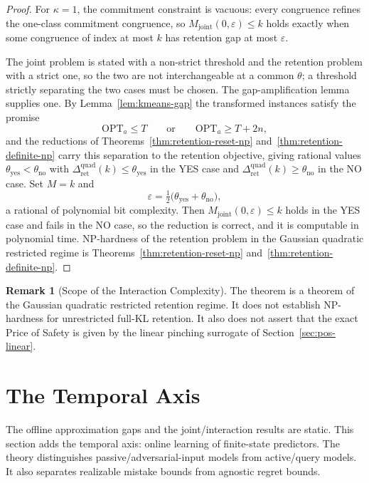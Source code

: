 \documentclass[12pt]{article}
\theoremstyle{definition}
\newtheorem{remark}[theorem]{Remark}
\newcommand{\RetQuad}{\Delta_{\mathrm{ret}}^{\mathrm{quad}}}
\begin{document}
\begin{proof}
For $\kappa=1$, the commitment constraint is vacuous: every congruence refines
the one-class commitment congruence, so $M_{\mathrm{joint}}(0,\varepsilon)\le k$
holds exactly when some congruence of index at most $k$ has retention gap at
most $\varepsilon$.

The joint problem is stated with a non-strict threshold and the retention
problem with a strict one, so the two are not interchangeable at a common
$\theta$; a threshold strictly separating the two cases must be chosen.  The
gap-amplification lemma supplies one.  By Lemma~\ref{lem:kmeans-gap} the
transformed instances satisfy the promise
\[
\mathrm{OPT}_a\le T
\qquad\text{or}\qquad
\mathrm{OPT}_a\ge T+2n ,
\]
and the reductions of Theorems~\ref{thm:retention-reset-np}
and~\ref{thm:retention-definite-np} carry this separation to the retention
objective, giving rational values $\theta_{\mathrm{yes}}<\theta_{\mathrm{no}}$
with $\RetQuad(k)\le\theta_{\mathrm{yes}}$ in the YES case and
$\RetQuad(k)\ge\theta_{\mathrm{no}}$ in the NO case.  Set $M=k$ and
\[
\varepsilon=\tfrac12\bigl(\theta_{\mathrm{yes}}+\theta_{\mathrm{no}}\bigr),
\]
a rational of polynomial bit complexity.  Then
$M_{\mathrm{joint}}(0,\varepsilon)\le k$ holds in the YES case and fails in the
NO case, so the reduction is correct, and it is computable in polynomial time.
NP-hardness of the retention problem in the Gaussian quadratic restricted
regime is Theorems~\ref{thm:retention-reset-np}
and~\ref{thm:retention-definite-np}.
\end{proof}

\begin{remark}[Scope of the Interaction Complexity]
\label{rem:interaction-complexity-scope}
The theorem is a theorem of the Gaussian quadratic restricted retention regime.
It does not establish NP-hardness for unrestricted full-KL retention.  It also
does not assert that the exact Price of Safety is given by the linear pinching
surrogate of Section~\ref{sec:pos-linear}.
\end{remark}

\section{The Temporal Axis}
\label{sec:temporal}

The offline approximation gaps and the joint/interaction results are static.
This section adds the temporal axis: online learning of finite-state
predictors.  The theory distinguishes passive/adversarial-input models from
active/query models.  It also separates realizable mistake bounds from
agnostic regret bounds.
\end{document}
